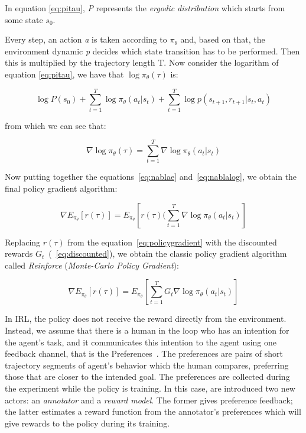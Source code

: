 In equation \ref{eq:pitau}, \textit{P} represents the \textsl{ergodic distribution} which starts from some state $s_{0}$. 

Every step, an action \textit{a} is taken according to $\pi_{\theta}$ and, based on that, the environment dynamic \textit{p} decides which state transition has to be performed. Then this is multiplied by the trajectory length T. Now consider the logarithm of equation \ref{eq:pitau}, we have that $\log\pi_{\theta}(\tau)$ is:

\begin{equation*}
    \log P(s_{0}) + \sum_{t=1}^{T} \log\pi_{\theta}(a_{t}|s_{t}) + \sum_{t=1}^{T} \log p(s_{t+1},r_{t+1}|s_{t}, a_{t}) 
\end{equation*}

from which we can see that:

\begin{equation}\label{eq:nablalog}
    \nabla \log\pi_{\theta}(\tau) = \sum_{t=1}^{T}\nabla\log\pi_{\theta}(a_{t}|s_{t})
\end{equation}

Now putting together the equations\ \ref{eq:nablae} and\ \ref{eq:nablalog}, we obtain the final policy gradient algorithm:

\begin{equation}\label{eq:policygradient}
    \nabla E_{\pi_{\theta}}[r(\tau)] = E_{\pi_{\theta}}[r(\tau)(\sum_{t=1}^{T} \nabla \log\pi_{\theta}(a_{t}|s_{t})]    
\end{equation}

Replacing $r(\tau)$ from the equation\ \ref{eq:policygradient} with the discounted rewards $G_{t}$\ (\ \ref{eq:discounted}), we obtain the classic policy gradient algorithm called \textit{Reinforce} (\textit{Monte-Carlo Policy Gradient}):

\begin{equation}
    \nabla E_{\pi_{\theta}}[r(\tau)] = E_{\pi_{\theta}}[\sum_{t=1}^{T} G_{t} \nabla \log\pi_{\theta}(a_{t}|s_{t})] 
\end{equation}

In IRL, the policy does not receive the reward directly from the environment. Instead,  we assume that there is a human in the loop who has an intention for the agent's task, and it communicates this intention to the agent using one feedback channel, that is the Preferences\ \cite{NIPS2018_8025}. The preferences are pairs of short trajectory segments of agent's behavior which the human compares, preferring those that are closer to the intended goal.
The preferences are collected during the experiment while the policy is training. 
In this case, are introduced two new actors: an \textit{annotator} and a \textit{reward model}. The former gives preference feedback; the latter estimates a reward function from the annotator's preferences which will give rewards to the policy during its training.
